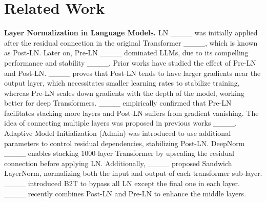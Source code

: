 \section{Related Work}
\textbf{Layer Normalization in Language Models.} 
LN ____ was initially applied after the residual connection in the original Transformer ____, which is known as Post-LN. Later on, Pre-LN  ____ dominated LLMs, due to its compelling performance and stability ____. Prior works have studied the effect of Pre-LN and Post-LN. 
____ proves that Post-LN tends to have larger gradients near the output layer, which necessitates smaller learning rates to stabilize training, whereas Pre-LN scales down gradients with the depth of the model, working better for deep Transformers.  ____ empirically confirmed that Pre-LN facilitates stacking more layers and Post-LN suffers from gradient vanishing. The idea of connecting multiple layers was proposed in previous works ____. Adaptive Model Initialization (Admin) was introduced to use additional parameters to control residual dependencies, stabilizing Post-LN. DeepNorm ____ enables stacking 1000-layer Transformer by upscaling the residual connection before applying LN. Additionally, ____ proposed Sandwich LayerNorm, normalizing both the input and output of each transformer sub-layer. ____ introduced B2T to bypass all LN except the final one in each layer. ____ recently combines Post-LN and Pre-LN to enhance the middle layers.